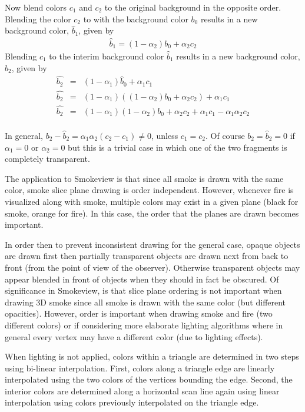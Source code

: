 \documentclass[11pt,twoside]{book}
\begin{document}
Now blend colors $c_1$ and $c_2$ to the original background in the opposite order.
Blending the color $c_2$ to with the background color $b_0$ results in a new background color, $\hat{b}_1$, given by
\begin{eqnarray*}
\hat{b}_1=(1-\alpha_2)b_0 + \alpha_2c_2
\end{eqnarray*}
Blending $c_1$ to the interim background color $\hat{b}_1$ results in a new background color, $\hat{b}_2$, given by
\begin{eqnarray*}
\hat{b_2}&=&(1-\alpha_1)\hat{b}_0+\alpha_1c_1\\
\hat{b_2}&=&(1-\alpha_1)((1-\alpha_2)b_0 + \alpha_2c_2)+\alpha_1c_1\\
\hat{b_2}&=&(1-\alpha_1)(1-\alpha_2)b_0 + \alpha_2c_2 + \alpha_1c_1 - \alpha_1\alpha_2c_2\\
\end{eqnarray*}


In general, $b_2-\hat{b}_2=\alpha_1\alpha_2(c_2-c_1)\ne 0$, unless $c_1=c_2$.  Of course $b_2=\hat{b}_2=0$ if $\alpha_1=0$ or $\alpha_2=0$ but this is a trivial case in which one of the two fragments is completely transparent.

The application to Smokeview is that since all smoke is drawn with the same color, smoke slice plane drawing is order independent.  However, whenever fire is visualized along with smoke, multiple colors may exist in a given plane (black for smoke, orange for fire).  In this case, the order that the planes are drawn becomes important.

In order then to prevent inconsistent drawing for the general
case, opaque objects are drawn first then partially transparent
objects are drawn next from back to front (from the point of view
of the observer). Otherwise transparent objects may appear blended
in front of objects when they should in fact be obscured. Of
significance in Smokeview, is that slice plane ordering is not
important when drawing 3D smoke since all smoke is drawn with the
same color (but different opacities).  However, order is important
when drawing smoke and fire (two different colors) or if
considering more elaborate lighting algorithms where in general
every vertex may have a different color (due to lighting effects).

When lighting is not applied, colors within a triangle are
determined in two steps using bi-linear interpolation. First,
colors along a triangle edge are linearly interpolated using the
two colors of the vertices bounding the edge. Second, the interior
colors are determined along a horizontal scan line again using
linear interpolation using colors previously interpolated on the
triangle edge.
\end{document}
